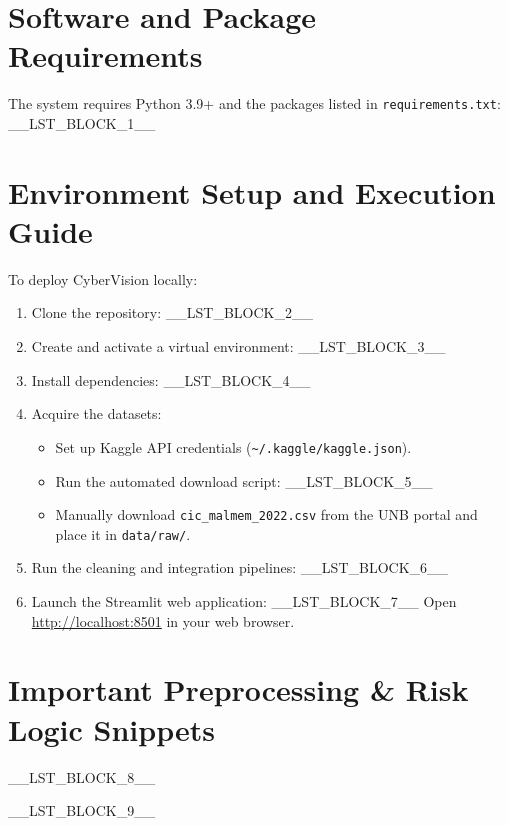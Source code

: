 \documentclass[a4paper, 12pt]{report}
\begin{document}
\section{Software and Package Requirements}
The system requires Python 3.9+ and the packages listed in \texttt{requirements.txt}:
\_\_LST\_BLOCK\_1\_\_

\section{Environment Setup and Execution Guide}
To deploy CyberVision locally:
\begin{enumerate}
    \item Clone the repository:
    \_\_LST\_BLOCK\_2\_\_
    \item Create and activate a virtual environment:
    \_\_LST\_BLOCK\_3\_\_
    \item Install dependencies:
    \_\_LST\_BLOCK\_4\_\_
    \item Acquire the datasets:
    \begin{itemize}
        \item Set up Kaggle API credentials (\texttt{\~{}/.kaggle/kaggle.json}).
        \item Run the automated download script:
        \_\_LST\_BLOCK\_5\_\_
        \item Manually download \texttt{cic\_malmem\_2022.csv} from the UNB portal and place it in \texttt{data/raw/}.
    \end{itemize}
    \item Run the cleaning and integration pipelines:
    \_\_LST\_BLOCK\_6\_\_
    \item Launch the Streamlit web application:
    \_\_LST\_BLOCK\_7\_\_
    Open \url{http://localhost:8501} in your web browser.
\end{enumerate}

\section{Important Preprocessing \& Risk Logic Snippets}

\_\_LST\_BLOCK\_8\_\_

\_\_LST\_BLOCK\_9\_\_
\end{document}
